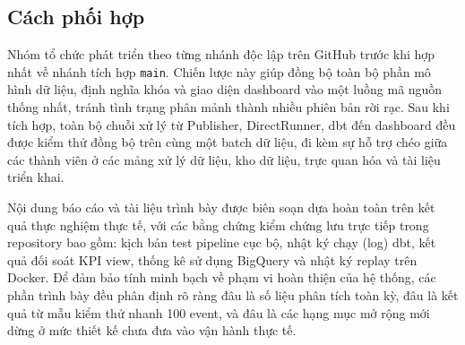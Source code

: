 \documentclass[a4paper, 11pt]{article}
\begin{document}
\subsection*{Cách phối hợp}

Nhóm tổ chức phát triển theo từng nhánh độc lập trên GitHub trước khi hợp nhất về nhánh tích hợp \texttt{main}. Chiến lược này giúp đồng bộ toàn bộ phần mô hình dữ liệu, định nghĩa khóa và giao diện dashboard vào một luồng mã nguồn thống nhất, tránh tình trạng phân mảnh thành nhiều phiên bản rời rạc. Sau khi tích hợp, toàn bộ chuỗi xử lý từ Publisher, DirectRunner, dbt đến dashboard đều được kiểm thử đồng bộ trên cùng một batch dữ liệu, đi kèm sự hỗ trợ chéo giữa các thành viên ở các mảng xử lý dữ liệu, kho dữ liệu, trực quan hóa và tài liệu triển khai.\medskip

Nội dung báo cáo và tài liệu trình bày được biên soạn dựa hoàn toàn trên kết quả thực nghiệm thực tế, với các bằng chứng kiểm chứng lưu trực tiếp trong repository bao gồm: kịch bản test pipeline cục bộ, nhật ký chạy (log) dbt, kết quả đối soát KPI view, thống kê sử dụng BigQuery và nhật ký replay trên Docker. Để đảm bảo tính minh bạch về phạm vi hoàn thiện của hệ thống, các phần trình bày đều phân định rõ ràng đâu là số liệu phân tích toàn kỳ, đâu là kết quả từ mẫu kiểm thử nhanh 100 event, và đâu là các hạng mục mở rộng mới dừng ở mức thiết kế chưa đưa vào vận hành thực tế.
\end{document}
